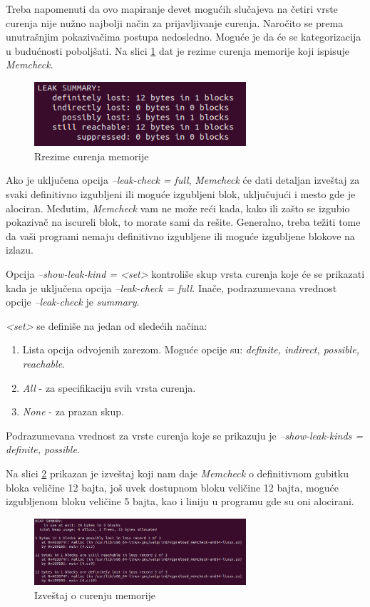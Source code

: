 \documentclass[12pt,oneside]{memoir}
\theoremstyle{plain}
\theoremstyle{definition}
\begin{document}
Treba napomenuti da ovo mapiranje devet mogućih slučajeva na četiri vrste curenja nije nužno najbolji način za prijavljivanje curenja. Naročito se prema unutrašnjim pokazivačima postupa nedosledno. Moguće je da će se kategorizacija u budućnosti poboljšati. Na slici  \ref{fig:slika2.13} dat je rezime curenja memorije koji ispisuje \textit{Memcheck}.
\begin{figure}[!ht]
  \centering
  \includegraphics[width=0.7\textwidth]{leakResume.png}
  \caption{Rrezime curenja memorije}
  \label{fig:slika2.13}
\end{figure}

Ako je uključena opcija \textit{--leak-check = full}, \textit{Memcheck} će dati detaljan izveštaj za svaki definitivno izgubljeni ili moguće izgubljeni blok, uključujući i mesto gde je alociran. Međutim, \textit{Memcheck} vam ne može reći kada, kako ili zašto se izgubio pokazivač na iscureli blok, to morate sami da rešite. Generalno, treba težiti tome da vaši programi nemaju definitivno izgubljene ili moguće izgubljene blokove na izlazu.

Opcija \textit{--show-leak-kind = <set>} kontroliše skup vrsta curenja koje će se prikazati kada je uključena opcija \textit{--leak-check = full}. Inače, podrazumevana vrednost opcije \textit{–leak-check} je \textit{summary}.

\textit{<set>} se definiše na jedan od sledećih načina:
\begin{enumerate}
\item Lista opcija odvojenih zarezom. Moguće opcije su: \textit{definite, indirect, possible, reachable}.
\item \textit{All} - za specifikaciju svih vrsta curenja.
\item \textit{None} -  za prazan skup.
\end{enumerate}
Podrazumevana vrednost za vrste curenja koje se prikazuju je \textit{--show-leak-kinds = definite, possible}.

Na slici \ref{fig:slika2.14} prikazan je izveštaj koji nam daje \textit{Memcheck} o definitivnom gubitku bloka veličine 12 bajta, još uvek dostupnom bloku veličine 12 bajta, moguće izgubljenom bloku veličine 5 bajta, kao i liniju u programu gde su oni alocirani. 
\begin{figure}[!ht]
  \centering
  \includegraphics[width=0.7\textwidth]{heapResume.png}
  \caption{Izveštaj o curenju memorije}
  \label{fig:slika2.14}
\end{figure}
\end{document}
